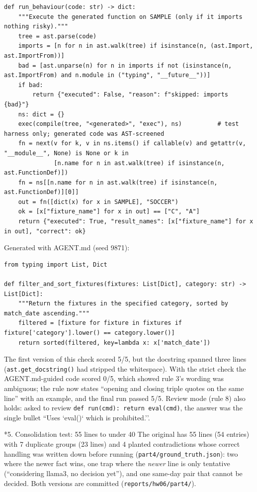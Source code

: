 \documentclass[11pt]{article}
\makeatletter
\renewcommand\subsection{\@startsection{subsection}{2}{\z@}{-2.2ex \@plus -1ex \@minus -.2ex}{0.8ex \@plus.2ex}{\normalfont\fontsize{12}{14.5}\selectfont\bfseries}}
\makeatother
\begin{document}
\begin{lstlisting}
def run_behaviour(code: str) -> dict:
    """Execute the generated function on SAMPLE (only if it imports nothing risky)."""
    tree = ast.parse(code)
    imports = [n for n in ast.walk(tree) if isinstance(n, (ast.Import, ast.ImportFrom))]
    bad = [ast.unparse(n) for n in imports if not (isinstance(n, ast.ImportFrom) and n.module in ("typing", "__future__"))]
    if bad:
        return {"executed": False, "reason": f"skipped: imports {bad}"}
    ns: dict = {}
    exec(compile(tree, "<generated>", "exec"), ns)          # test harness only; generated code was AST-screened
    fn = next(v for k, v in ns.items() if callable(v) and getattr(v, "__module__", None) is None or k in
              [n.name for n in ast.walk(tree) if isinstance(n, ast.FunctionDef)])
    fn = ns[[n.name for n in ast.walk(tree) if isinstance(n, ast.FunctionDef)][0]]
    out = fn([dict(x) for x in SAMPLE], "SOCCER")
    ok = [x["fixture_name"] for x in out] == ["C", "A"]
    return {"executed": True, "result_names": [x["fixture_name"] for x in out], "correct": ok}
\end{lstlisting}
\endgroup
Generated with AGENT.md (seed 9871):

\begingroup\lstset{basicstyle=\ttfamily\footnotesize}
\begin{lstlisting}
from typing import List, Dict

def filter_and_sort_fixtures(fixtures: List[Dict], category: str) -> List[Dict]:
    """Return the fixtures in the specified category, sorted by match_date ascending."""
    filtered = [fixture for fixture in fixtures if fixture['category'].lower() == category.lower()]
    return sorted(filtered, key=lambda x: x['match_date'])
\end{lstlisting}
\endgroup
The first version of this check scored 5/5, but the docstring spanned three lines (\texttt{ast.get\_docstring()} had stripped the whitespace). With the strict check the AGENT.md-guided code scored 0/5, which showed rule 3's wording was ambiguous; the rule now states ``opening and closing triple quotes on the same line'' with an example, and the final run passed 5/5. Review mode (rule 8) also holds: asked to review \texttt{def run(cmd): return eval(cmd)}, the answer was the single bullet ``Uses `eval()` which is prohibited.''.

\subsection*{5. Consolidation test: 55 lines to under 40}
The original has 55 lines (54 entries) with 7 duplicate groups (23 lines) and 4 planted contradictions whose correct handling was written down before running (\verb|part4/ground_truth.json|): two where the newer fact wins, one trap where the \emph{newer} line is only tentative (``considering llama3, no decision yet''), and one same-day pair that cannot be decided. Both versions are committed (\verb|reports/hw06/part4/|).
\end{document}
